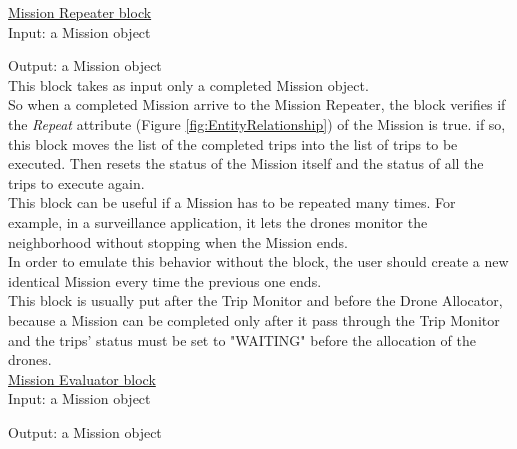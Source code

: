 \underline{Mission Repeater block}
\\

Input: a Mission object

Output: a Mission object
\\

This block takes as input only a completed Mission object.
\\
So when a completed Mission arrive to the Mission Repeater, the block verifies if the \textit{Repeat} attribute (Figure \ref{fig:EntityRelationship}) of the Mission is true.
if so, this block moves the list of the completed trips into the list of trips to be executed.
Then resets the status of the Mission itself and the status of all the trips to execute again.
\\
This block can be useful if a Mission has to be repeated many times.
For example, in a surveillance application, it lets the drones monitor the neighborhood without stopping when the Mission ends.
\\
In order to emulate this behavior without the block, the user should create a new identical Mission every time the previous one ends.
\\
This block is usually put after the Trip Monitor and before the Drone Allocator, because a Mission can be completed only after it pass through the Trip Monitor and the trips' status must be set to "WAITING" before the allocation of the drones.
\\

\underline{Mission Evaluator block}
\\

Input: a Mission object

Output: a Mission object
\\

